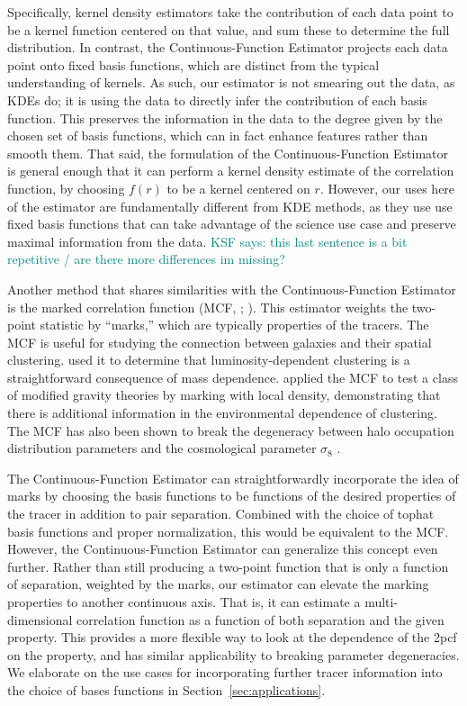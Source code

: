 \documentclass[modern]{aastex62}
\newcommand{\cf}{2pcf\xspace} %
\newcommand{\Est}{The Continuous-Function Estimator\xspace}
\newcommand{\est}{the Continuous-Function Estimator\xspace}
\newcommand{\KSF}[1]{\textcolor{teal}{KSF says: #1}}
\begin{document}
Specifically, kernel density estimators take the contribution of each data point to be a kernel function centered on that value, and sum these to determine the full distribution.
In contrast, \est projects each data point onto fixed basis functions, which are distinct from the typical understanding of kernels.
As such, our estimator is not smearing out the data, as KDEs do; it is using the data to directly infer the contribution of each basis function.
This preserves the information in the data to the degree given by the chosen set of basis functions, which can in fact enhance features rather than smooth them.
That said, the formulation of \est is general enough that it can perform a kernel density estimate of the correlation function, by choosing $f(r)$ to be a kernel centered on $r$.
However, our uses here of the estimator are fundamentally different from KDE methods, as they use use fixed basis functions that can take advantage of the science use case and preserve maximal information from the data.
\KSF{this last sentence is a bit repetitive / are there more differences im missing?}

Another method that shares similarities with \est is the marked correlation function (MCF, \citealt{Beisbart2000}; \citealt{Sheth2005}).
This estimator weights the two-point statistic by ``marks,'' which are typically properties of the tracers.
The MCF is useful for studying the connection between galaxies and their spatial clustering.
\cite{Skibba2006} used it to determine that luminosity-dependent clustering is a straightforward consequence of mass dependence.
\cite{Armijo2018} applied the MCF to test a class of modified gravity theories by marking with local density, demonstrating that there is additional information in the environmental dependence of clustering.
The MCF has also been shown to break the degeneracy between halo occupation distribution parameters and the cosmological parameter $\sigma_8$ \citep{WhitePadmanabhan2009}.

\Est can straightforwardly incorporate the idea of marks by choosing the basis functions to be functions of the desired properties of the tracer in addition to pair separation.
Combined with the choice of tophat basis functions and proper normalization, this would be equivalent to the MCF. 
However, \est can generalize this concept even further. 
Rather than still producing a two-point function that is only a function of separation, weighted by the marks, our estimator can elevate the marking properties to another continuous axis.
That is, it can estimate a multi-dimensional correlation function as a function of both separation and the given property.
This provides a more flexible way to look at the dependence of the \cf on the property, and has similar applicability to breaking parameter degeneracies.
We elaborate on the use cases for incorporating further tracer information into the choice of bases functions in Section~\ref{sec:applications}.
\end{document}
